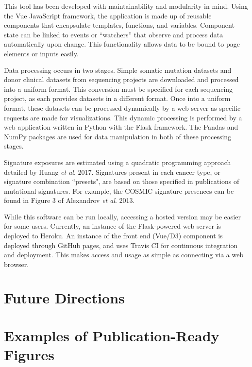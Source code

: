 \documentclass[12pt, letterpaper]{article}
\begin{document}

This tool has been developed with maintainability and modularity in mind.
Using the Vue JavaScript framework, the application is made up of reusable components that encapsulate templates, functions, and variables.
Component state can be linked to events or ``watchers'' that observe and process data automatically upon change.
This functionality allows data to be bound to page elements or inputs easily.

Data processing occurs in two stages. 
Simple somatic mutation datasets and donor clinical datasets from sequencing projects are downloaded and processed into a uniform format. 
This conversion must be specified for each sequencing project, as each provides datasets in a different format.
Once into a uniform format, these datasets can be processed dynamically by a web server as specific requests are made for visualizations.
This dynamic processing is performed by a web application written in Python with the Flask framework. 
The Pandas and NumPy packages are used for data manipulation in both of these processing stages.

Signature exposures are estimated using a quadratic programming approach detailed by Huang \textit{et al}. 2017\cite{huang2017detecting}.
Signatures present in each cancer type, or signature combination ``presets", are based on those specified in publications of mutational signatures.
For example, the COSMIC signature presences can be found in Figure 3 of Alexandrov \textit{et al}. 2013\cite{alexandrov2013signatures}.

While this software can be run locally, accessing a hosted version may be easier for some users.
Currently, an instance of the Flask-powered web server is deployed to Heroku.
An instance of the front end (Vue/D3) component is deployed through GitHub pages, and uses Travis CI for continuous integration and deployment.
This makes access and usage as simple as connecting via a web browser.

\section{Future Directions}


{}


\pagebreak
\appendix                                     
\section{Examples of Publication-Ready Figures}
\renewcommand{\figurename}{Example Figure}
\setcounter{figure}{0}
\end{document}
